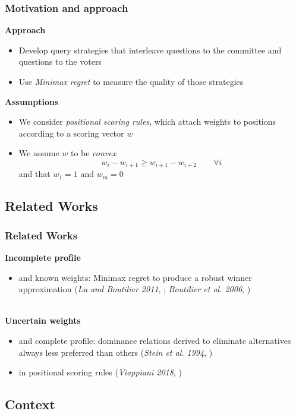 \documentclass{beamer}
\begin{document}
\begin{frame}
	\frametitle{Motivation and approach}
	 \textbf{Approach}
	\begin{itemize}
		\item Develop query strategies that interleave questions to the committee and questions to the voters
		\item Use \emph{Minimax regret} to measure the quality of those strategies
	\end{itemize}
	 \textbf{Assumptions}
	\begin{itemize}
		\item We consider \textit{positional scoring rules}, which attach weights to positions according to a scoring vector $w$
		\item We assume $w$ to be \textit{convex}
		\[ w_i - w_{i+1} \geq w_{i+1}-w_{i+2} \qquad \forall i\]
		and that $w_1=1$ and $w_m=0$
	\end{itemize}	
\end{frame}

\subsection{Related Works}
\begin{frame}
	\frametitle{Related Works}
	\textbf{Incomplete profile}  
	\begin{itemize}
		\item and known weights: Minimax regret to produce a robust winner approximation (\textit{Lu and Boutilier 2011}, \cite{Lu2011}; \textit{Boutilier et al. 2006}, \cite{Boutilier2006})
	\end{itemize}~\\
	\textbf{Uncertain weights} 
	\begin{itemize}
		\item and complete profile: dominance relations derived to eliminate alternatives always less preferred than others (\textit{Stein et al. 1994}, \cite{Stein1994})
		\item in positional scoring rules (\textit{Viappiani 2018}, \cite{Viappiani2018})
	\end{itemize}
\end{frame}

\subsection{Context}
\end{document}
